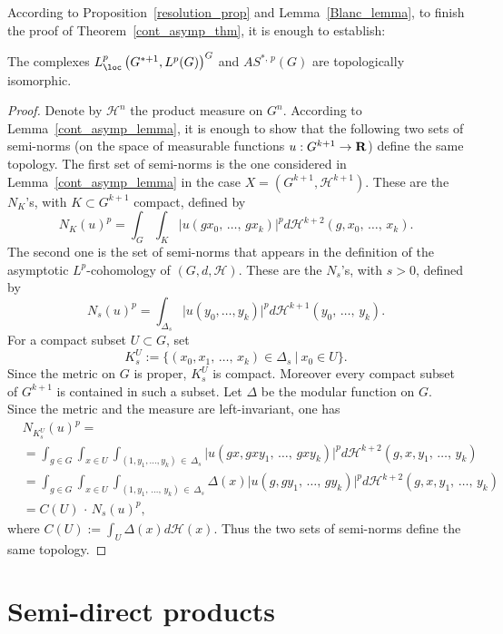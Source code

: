 According to Proposition~\ref{resolution_prop} and Lemma~\ref{Blanc_lemma}, to finish the proof of Theorem~\ref{cont_asymp_thm}, it is enough to establish:


\begin{lemm}
The complexes $L_{\loc}^p\left(G^{*+1}, L^p(G)\right)^G$ and $AS^{*,\,p}(G)$ are topologically isomorphic.
\end{lemm}

\begin{proof}
Denote by $\mathcal H ^n$ the product measure on $G^n$. According to Lemma~\ref{cont_asymp_lemma}, it is enough to show that the following two sets of semi-norms (on the space of measurable functions $u: G^{k+1} \to {\bf R}$) define the same topology. The first set of semi-norms is the one considered in Lemma~\ref{cont_asymp_lemma} in the case $X = (G ^{k+1}, \mathcal H ^{k+1})$. These are the $N_K$'s, with $K \subset G^{k+1}$ compact, defined by
\[
N_K (u) ^p = \int _G \int _K \bigl\vert u (gx_0,\,\dots,\,gx_k) \bigr\vert ^p d\mathcal H ^{k+2}(g, x_0,\,\dots,\,x_k).
\]
The second one is the set of semi-norms that appears in the definition of the asymptotic $L^p$-cohomology of $(G, d, \mathcal H)$. These are the $N_s$'s, with $s>0$, defined by
\[
N_s (u)^p = \int _{\Delta _s } \bigl\vert u (y_0,\dots, y_k)\bigr \vert^p
d\mathcal H ^{k+1} (y_0,\,\dots,\,y_k).
\]
For a compact subset $U \subset G$, set
\[
K _s ^U:= \{(x_0, x_1,\,\dots,\,x_k) \in \Delta _s~\vert~x_0 \in U\}.
\]
Since the metric on $G$ is proper, $ K _s ^U$ is compact. Moreover every compact subset of $G^{k+1}$ is contained in such a subset. Let $\Delta$ be the modular function on $G$. Since the metric and the measure are left-invariant, one has
\begin{align*}
&N _{K_s ^U} (u) ^p =\\
&=\int _{g \in G} \int _{x \in U} \int _{(1, y_1,\dots, y_k)\,\in\,\Delta _s }
\bigl\vert u(gx, gxy_1,\,\dots,\,gxy_k) \bigr\vert^p d\mathcal H ^{k+2}(g, x, y_1,\,\dots,\,y_k) \\
&=\int _{g \in G} \int _{x \in U} \int _{(1, y_1,\,\dots,\,y_k)\,\in\,\Delta _s } \Delta (x)
\bigl\vert u(g, gy_1,\,\dots,\,gy_k) \bigr\vert^p d\mathcal H ^{k+2}(g, x, y_1,\,\dots,\,y_k) \\
&= C(U)\,\cdot\,N_s (u) ^p,
\end{align*}
where $C(U):= \int _U \Delta (x) d\mathcal H (x)$. Thus the two sets of semi-norms define the same topology.
\end{proof}

\section{Semi-direct products}\label{5}

